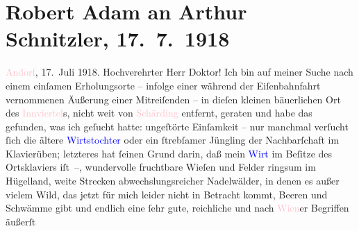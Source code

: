 

               \section[Robert Adam an Arthur Schnitzler, 17. 7. 1918]{ Robert Adam an Arthur Schnitzler, 17. 7. 1918}\nopagebreak{}\rehead{ }\normalsize\beginnumbering{} \toendnotes[C]{\smallbreak\pagebreak[2]} 
\toendnotes[C]{\smallbreak}\pstart
           \raggedleft{}{\pb}\textcolor{pink}{Andorf}{}\ledrightnote{\textcolor{pink}{Andorf}}, 17. Juli 1918.\pend
           \pstart{}Hochverehrter Herr Doktor!\pend\pstart
           Ich bin auf meiner Suche nach einem einſamen Erholungsorte – infolge einer während
               der Eiſenbahnfahrt vernommenen Äußerung einer Mitreiſenden – in dieſen kleinen
               bäuerlichen Ort des \textcolor{pink}{Innviertel}{}\ledrightnote{\textcolor{pink}{Innviertel}}s, nicht weit von \textcolor{pink}{Schärding}{}\ledrightnote{\textcolor{pink}{Schärding}} entfernt, geraten und habe das gefunden,
               was ich geſucht hatte: ungeſtörte Einſamkeit – nur manchmal verſucht ſich die ältere
                  \textcolor{blue}{Wirtstochter}{} oder ein
               ſtrebſamer Jüngling der Nachbarſchaft im Klavierüben; letzteres hat ſeinen Grund
               darin, daß mein \textcolor{blue}{Wirt}{} im Beſitze
               des Ortsklaviers iſt –, wundervolle fruchtbare Wieſen und Felder ringsum im
               Hügelland, weite Strec{\pb}ken
               abwechslungsreicher Nadelwälder, in denen es außer vielem Wild, das jetzt für mich
               leider nicht in Betracht kommt, Beeren und Schwämme gibt und endlich eine ſehr gute,
               reichliche und nach \textcolor{pink}{Wien}{}\ledrightnote{\textcolor{pink}{Wien}}er Begriffen äußerſt
